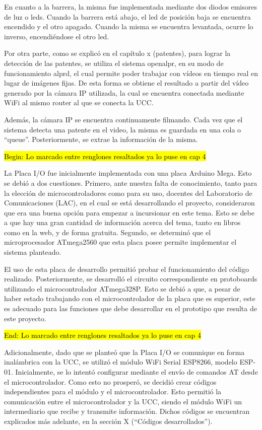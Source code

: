 En cuanto a la barrera, la misma fue implementada mediante dos diodos emisores de luz o leds. Cuando la barrera está abajo, el led de posición baja se encuentra encendido y el otro apagado. Cuando la misma se encuentra levantada, ocurre lo inverso, encendiéndose el otro led.

\textcolor{mPurple}{Por otra parte, como se explicó en el \textcolor{mGreen}{capítulo x (patentes)}, para lograr la detección de las patentes, se utiliza el sistema openalpr, en su modo de funcionamiento alprd, el cual permite poder trabajar con vídeos en tiempo real en lugar de imágenes fijas. De esta forma se obtiene el resultado a partir del vídeo generado por la cámara IP utilizada, la cual se encuentra conectada mediante WiFi al mismo router al que se conecta la UCC.}

\textcolor{mPurple}{Además, la cámara IP se encuentra continuamente filmando. Cada vez que el sistema detecta una patente en el video, la misma es guardada en una cola o “queue”. Posteriormente, se extrae la información de la misma.}

\hl{Begin: Lo marcado entre renglones resaltados ya lo puse en cap 4}

La Placa I/O fue inicialmente implementada con una placa Arduino Mega. Esto se debió a dos cuestiones. Primero, ante nuestra falta de conocimiento, tanto para la elección de microcontroladores como para su uso, docentes del Laboratorio de Comunicaciones (LAC), en el cual se está desarrollando el proyecto, consideraron que era una buena opción para empezar a incursionar en este tema. Esto se debe a que hay una gran cantidad de información acerca del tema, tanto en libros como en la web, y de forma gratuita. Segundo, se determinó que el microprocesador ATmega2560 que esta placa posee permite implementar el sistema planteado.

El uso de esta placa de desarrollo permitió probar el funcionamiento del código realizado. Posteriormente, se desarrolló el circuito correspondiente en protoboards utilizando el microcontrolador ATmega328P. Esto se debió a que, a pesar de haber estado trabajando con el microcontrolador de la placa que es superior, este es adecuado para las funciones que debe desarrollar en el prototipo que resulta de este proyecto. 
 
\hl{End: Lo marcado entre renglones resaltados ya lo puse en cap 4}

Adicionalmente, dado que se planteó que la Placa I/O se comunique en forma inalámbrica con la UCC, se utilizó el módulo WiFi Serial ESP8266, modelo ESP-01. Inicialmente, se lo intentó configurar mediante el envío de comandos AT desde el microcontrolador. Como esto no prosperó, se decidió crear códigos independientes para el módulo y el microcontrolador. Esto permitió la comunicación entre el microcontrolador y la UCC, siendo el módulo WiFi un intermediario que recibe y transmite información. Dichos códigos se encuentran explicados más adelante, en la \textcolor{mGreen}{sección X (“Códigos desarrollados”)}.

